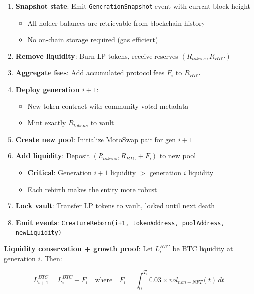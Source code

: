 \documentclass[11pt,a4paper]{article}
\begin{document}
\begin{enumerate}
    \item \textbf{Snapshot state}: Emit \texttt{GenerationSnapshot} event with current block height
    \begin{itemize}
        \item All holder balances are retrievable from blockchain history
        \item No on-chain storage required (gas efficient)
    \end{itemize}

    \item \textbf{Remove liquidity}: Burn LP tokens, receive reserves $(R_{tokens}, R_{BTC})$

    \item \textbf{Aggregate fees}: Add accumulated protocol fees $F_i$ to $R_{BTC}$

    \item \textbf{Deploy generation $i+1$}:
    \begin{itemize}
        \item New token contract with community-voted metadata
        \item Mint exactly $R_{tokens}$ to vault
    \end{itemize}

    \item \textbf{Create new pool}: Initialize MotoSwap pair for gen $i+1$

    \item \textbf{Add liquidity}: Deposit $(R_{tokens}, R_{BTC} + F_i)$ to new pool
    \begin{itemize}
        \item \textbf{Critical}: Generation $i+1$ liquidity $>$ generation $i$ liquidity
        \item Each rebirth makes the entity more robust
    \end{itemize}

    \item \textbf{Lock vault}: Transfer LP tokens to vault, locked until next death

    \item \textbf{Emit events}: \texttt{CreatureReborn(i+1, tokenAddress, poolAddress, newLiquidity)}
\end{enumerate}

\textbf{Liquidity conservation + growth proof}: Let $L_i^{BTC}$ be BTC liquidity at generation $i$. Then:

\begin{equation}
L_{i+1}^{BTC} = L_i^{BTC} + F_i \quad \text{where} \quad F_i = \int_0^{T_i} 0.03 \times vol_{non-NFT}(t) \, dt
\end{equation}
\end{document}

